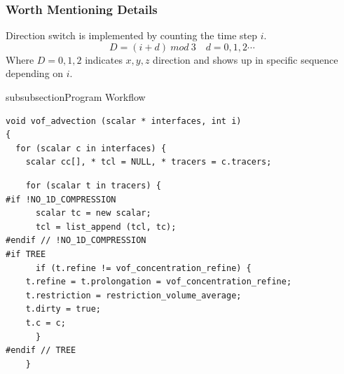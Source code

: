 \subsubsection{Worth Mentioning Details}
Direction switch is implemented by counting the time step $i$. 
\begin{equation}
    D = (i+d)\ mod \ 3 \quad d = 0,1,2\cdots
\end{equation}
Where $D = 0,1,2$ indicates $x,y,z$ direction and shows up in specific sequence depending on $i$.

\begin{codesection}{subsubsection}{Program Workflow}
\begin{verbatim}
void vof_advection (scalar * interfaces, int i)
{
  for (scalar c in interfaces) {
    scalar cc[], * tcl = NULL, * tracers = c.tracers; 
\end{verbatim}
\codearrow
{}
\begin{verbatim}
    for (scalar t in tracers) {
#if !NO_1D_COMPRESSION
      scalar tc = new scalar;
      tcl = list_append (tcl, tc);
#endif // !NO_1D_COMPRESSION
#if TREE
      if (t.refine != vof_concentration_refine) {
	t.refine = t.prolongation = vof_concentration_refine;
	t.restriction = restriction_volume_average;
	t.dirty = true;
	t.c = c;
      }
#endif // TREE
    }
\end{verbatim}
\codearrow
{}
\end{codesection}
